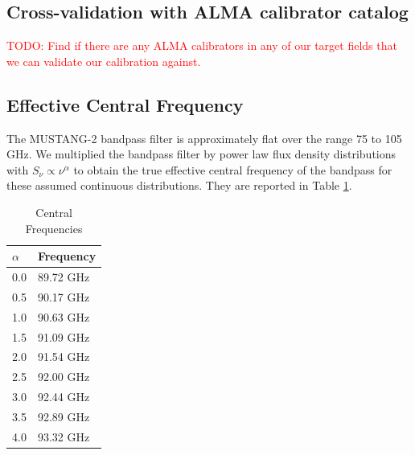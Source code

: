 \documentclass[twocolumn]{aastex62}
\def\todo#1{{\textcolor{red}{TODO: #1}}}
\begin{document}

%

\subsection{Cross-validation with ALMA calibrator catalog}
\todo{Find if there are any ALMA calibrators in any of our target fields that
we can validate our calibration against.}

\subsection{Effective Central Frequency}
The MUSTANG-2 bandpass filter is approximately flat over the range 75 to 105 GHz.
We multiplied the bandpass filter by power law flux density distributions with $S_\nu\propto\nu^{\alpha}$
to obtain the true effective central frequency of the bandpass for these assumed
continuous distributions.  They are reported in Table \ref{tab:centralfreq}.

\begin{table}[htp]
    \caption{Central Frequencies}
\begin{tabular}{ll}
    \label{tab:centralfreq}
$\alpha$ & Frequency \\
\hline
0.0 & 89.72 GHz \\
0.5 & 90.17 GHz \\
1.0 & 90.63 GHz \\
1.5 & 91.09 GHz \\
2.0 & 91.54 GHz \\
2.5 & 92.00 GHz \\
3.0 & 92.44 GHz \\
3.5 & 92.89 GHz \\
4.0 & 93.32 GHz \\
\hline
\end{tabular}
\end{table}
\end{document}
